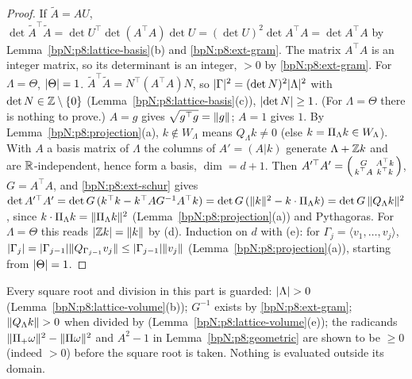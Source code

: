 \begin{proof}
\label{stepN:p8:lv-ab} If $\tilde A=AU$, $\det\tilde A^\top\tilde A=\det U^\top\det(A^\top A)\det U=(\det U)^2\det A^\top A=\det A^\top A$ by Lemma~\ref{bpN:p8:lattice-basis}(b) and \ref{bpN:p8:ext-gram}. The matrix $A^\top A$ is an integer matrix, so its determinant is an integer, $>0$ by \ref{bpN:p8:ext-gram}. For $\Lambda=\Theta$, $\lvert \Theta\rvert=1$.
\label{stepN:p8:lv-c} $\tilde A^\top\tilde A=N^\top(A^\top A)N$, so $\lvert \Gamma\rvert^2=(\det N)^2\lvert \Lambda\rvert^2$ with $\det N\in\mathbb{Z}\setminus\{0\}$ (Lemma~\ref{bpN:p8:lattice-basis}(c)), $\lvert \det N\rvert\ge1$. (For $\Lambda=\Theta$ there is nothing to prove.)
\label{stepN:p8:lv-d} $A=g$ gives $\sqrt{g^\top g}=\lVert g\rVert$; $A=1$ gives $1$.
\label{stepN:p8:lv-e} By Lemma~\ref{bpN:p8:projection}(a), $k\notin W_\Lambda$ means $Q_\Lambda k\ne0$ (else $k=\Pi_\Lambda k\in W_\Lambda$). With $A$ a basis matrix of $\Lambda$ the columns of $A'=(A|k)$ generate $\Lambda+\mathbb{Z} k$ and are $\mathbb{R}$-independent, hence form a basis, $\dim=d+1$. Then $A'^\top A'=\begin{psmallmatrix}G&A^\top k\\k^\top A&k^\top k\end{psmallmatrix}$, $G=A^\top A$, and \ref{bpN:p8:ext-schur} gives $\det A'^\top A'=\det G\,(k^\top k-k^\top AG^{-1}A^\top k)=\det G\,(\lVert k\rVert^2-k\cdot\Pi_\Lambda k)=\det G\,\lVert Q_\Lambda k\rVert^2$, since $k\cdot\Pi_\Lambda k=\lVert \Pi_\Lambda k\rVert^2$ (Lemma~\ref{bpN:p8:projection}(a)) and Pythagoras. For $\Lambda=\Theta$ this reads $\lvert \mathbb{Z} k\rvert=\lVert k\rVert$ by (d).
\label{stepN:p8:lv-f} Induction on $d$ with (e): for $\Gamma_{j}=\langle v_1,\dots,v_j\rangle$, $\lvert \Gamma_{j}\rvert=\lvert \Gamma_{j-1}\rvert\lVert Q_{\Gamma_{j-1}}v_j\rVert\le\lvert \Gamma_{j-1}\rvert\lVert v_j\rVert$ (Lemma~\ref{bpN:p8:projection}(a)), starting from $\lvert \Theta\rvert=1$.
\end{proof}

\begin{remark}[Totality]\label{bpN:p8:totality}
Every square root and division in this part is guarded: $\lvert \Lambda\rvert>0$ (Lemma~\ref{bpN:p8:lattice-volume}(b)); $G^{-1}$ exists by \ref{bpN:p8:ext-gram}; $\lVert Q_\Lambda k\rVert>0$ when divided by (Lemma~\ref{bpN:p8:lattice-volume}(e)); the radicands $\lVert \Pi_+\omega\rVert^2-\lVert \Pi\omega\rVert^2$ and $A^2-1$ in Lemma~\ref{bpN:p8:geometric} are shown to be $\ge0$ (indeed $>0$) before the square root is taken. Nothing is evaluated outside its domain.
\end{remark}

